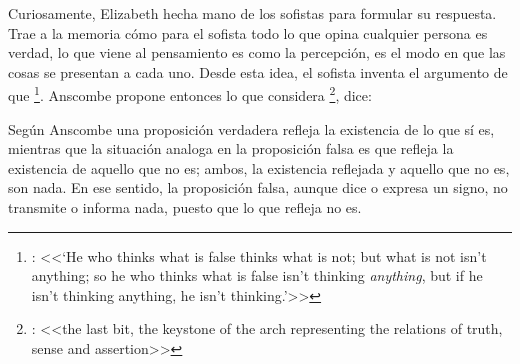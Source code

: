    Curiosamente, Elizabeth hecha mano de los sofistas para formular su respuesta. Trae a la memoria cómo para el sofista todo lo que opina cualquier persona es verdad, lo que viene al pensamiento es como la percepción, es el modo en que las cosas se presentan a cada uno. Desde esta idea, el sofista inventa el argumento de que \footnote{\cite[264]{anscombe2015logic:tsa}: <<`He who thinks what is false thinks what is not; but what is not isn't anything; so he who thinks what is false isn't thinking \emph{anything}, but if he isn't thinking anything, he isn't thinking.'>>}. Anscombe propone entonces lo que considera \footnote{\cite[271]{anscombe2015logic:tsa}: <<the last bit, the keystone of the arch representing the relations of truth, sense and assertion>>}, dice:

   Según Anscombe una proposición verdadera refleja la existencia de lo que sí es, mientras que la situación analoga en la proposición falsa es que refleja la existencia de aquello que no es; ambos, la existencia reflejada y aquello que no es, son nada\autocite[271]{anscombe2015logic:tsa}. En ese sentido, la proposición falsa, aunque dice o expresa un signo, no transmite o informa nada, puesto que lo que refleja no es.

